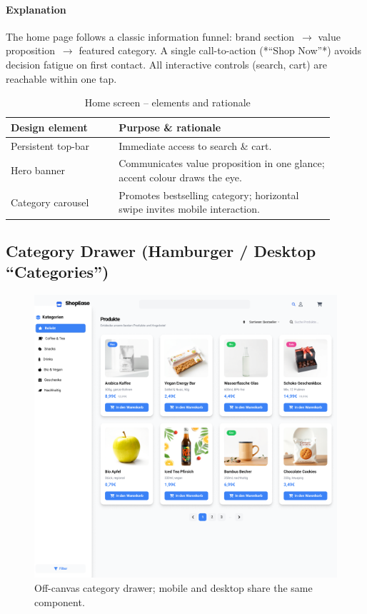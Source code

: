 \documentclass[11pt,a4paper]{article}
\begin{document}
\paragraph{Explanation}%
The home page follows a classic information funnel: brand section~$\rightarrow$ value
proposition~$\rightarrow$ featured category. A single call-to-action
(*“Shop Now”*) avoids decision fatigue on first contact.  
All interactive controls (search, cart) are reachable within one
tap.

\begin{table}[H]
	\centering
	\caption{Home screen – elements and rationale}
	\label{tab:home-elements}
	\begin{tabular}{p{0.30\linewidth} p{0.60\linewidth}}
		\toprule
		\textbf{Design element} & \textbf{Purpose \& rationale} \\ \midrule
		Persistent top-bar      & Immediate access to search \& cart.\\
		Hero banner             & Communicates value proposition in one glance; accent colour draws the eye.\\
		Category carousel       & Promotes bestselling category; horizontal swipe invites mobile interaction.\\
		
		\bottomrule
	\end{tabular}
\end{table}
\subsection{Category Drawer (Hamburger / Desktop “Categories”)}

\begin{figure}[H]
	\centering
	\includegraphics[width=\linewidth]{pictures/main/categories_Figma}%
	\caption{Off-canvas category drawer; mobile and desktop share the same component.}
	\label{fig:ui-category-drawer}
\end{figure}
\end{document}
